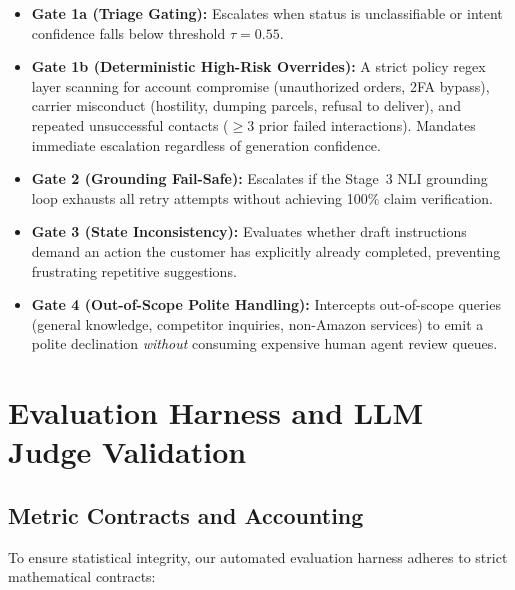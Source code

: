 \documentclass[10pt,twocolumn,a4paper]{article}
\begin{document}
\begin{itemize}
  \item \textbf{Gate 1a (Triage Gating):} Escalates when status is
        unclassifiable or intent confidence falls below threshold
        $\tau{=}0.55$.

  \item \textbf{Gate 1b (Deterministic High-Risk Overrides):} A strict
        policy regex layer scanning for account compromise (unauthorized
        orders, 2FA bypass), carrier misconduct (hostility, dumping
        parcels, refusal to deliver), and repeated unsuccessful contacts
        ($\ge$3 prior failed interactions). Mandates immediate escalation
        regardless of generation confidence.

  \item \textbf{Gate 2 (Grounding Fail-Safe):} Escalates if the Stage~3
        NLI grounding loop exhausts all retry attempts without achieving
        100\% claim verification.

  \item \textbf{Gate 3 (State Inconsistency):} Evaluates whether draft
        instructions demand an action the customer has explicitly already
        completed, preventing frustrating repetitive suggestions.

  \item \textbf{Gate 4 (Out-of-Scope Polite Handling):} Intercepts
        out-of-scope queries (general knowledge, competitor inquiries,
        non-Amazon services) to emit a polite declination \textit{without}
        consuming expensive human agent review queues.
\end{itemize}

\section{Evaluation Harness and LLM Judge Validation}\label{sec:harness}

\subsection{Metric Contracts and Accounting}
To ensure statistical integrity, our automated evaluation harness
adheres to strict mathematical contracts:
\end{document}
